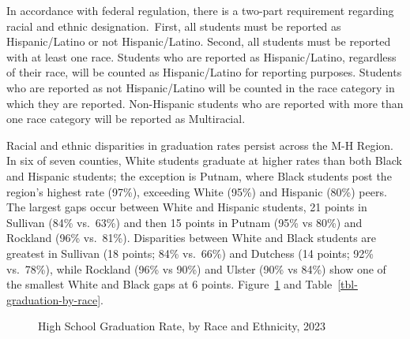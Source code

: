 \documentclass[
  english,
  letterpaper,
]{report}
\begin{document}
In accordance with federal regulation, there is a two-part requirement
regarding racial and ethnic designation.~First, all students must be
reported as Hispanic/Latino or not Hispanic/Latino. Second, all students
must be reported with at least one race. Students who are reported as
Hispanic/Latino, regardless of their race, will be counted as
Hispanic/Latino for reporting purposes. Students who are reported as not
Hispanic/Latino will be counted in the race category in which they are
reported. Non-Hispanic students who are reported with more than one race
category will be reported as Multiracial.~

Racial and ethnic disparities in graduation rates persist across the M-H
Region. In six of seven counties, White students graduate at higher
rates than both Black and Hispanic students; the exception is Putnam,
where Black students post the region's highest rate (97\%), exceeding
White (95\%) and Hispanic (80\%) peers. The largest gaps occur between
White and Hispanic students, 21 points in Sullivan (84\% vs.~63\%) and
then 15 points in Putnam (95\% vs 80\%) and Rockland (96\% vs.~81\%).
Disparities between White and Black students are greatest in Sullivan
(18 points; 84\% vs.~66\%) and Dutchess (14 points; 92\% vs.~78\%),
while Rockland (96\% vs 90\%) and Ulster (90\% vs 84\%) show one of the
smallest White and Black gaps at 6 points.
Figure~\ref{fig-graduation-by-race} and
Table~\ref{tbl-graduation-by-race}.

\begin{figure}


\caption{\label{fig-graduation-by-race}High School Graduation Rate, by
Race and Ethnicity, 2023}

\end{figure}%
\end{document}
